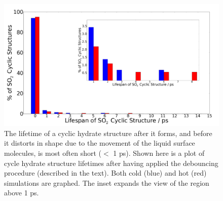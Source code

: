 \begin{figure}[h!]
	\begin{center}
		\includegraphics[scale=1.0]{images/cycles/cyclic-lifespans-inset-small.png}
		\caption{The lifetime of a cyclic hydrate structure after it forms, and before it distorts in shape due to the movement of the liquid surface molecules, is most often short ($<$ 1 ps). Shown here is a plot of cycle hydrate structure lifetimes after having applied the debouncing procedure (described in the text). Both cold (blue) and hot (red) simulations are graphed. The inset expands the view of the region above 1 ps.}
		\label{fig:cycle-lifespans}
	\end{center}
\end{figure}

